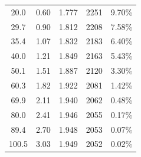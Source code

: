 \documentclass{thuemp}
\begin{document}
\begin{table}[H]
\begin{tabular}{ccccc}
        20.0   & 0.60  & 1.777 & 2251 & 9.70\%  \\
        29.7   & 0.90  & 1.812 & 2208 & 7.58\%  \\
        35.4   & 1.07  & 1.832 & 2183 & 6.40\%  \\
        40.0   & 1.21  & 1.849 & 2163 & 5.43\%  \\
        50.1   & 1.51  & 1.887 & 2120 & 3.30\%  \\
        60.3   & 1.82  & 1.922 & 2081 & 1.42\%  \\
        69.9   & 2.11  & 1.940 & 2062 & 0.48\%  \\
        80.0   & 2.41  & 1.946 & 2055 & 0.17\%  \\
        89.4   & 2.70  & 1.948 & 2053 & 0.07\%  \\
        100.5  & 3.03  & 1.949 & 2052 & 0.02\%  \\
        \bottomrule
    \end{tabular}
\end{table}
\end{document}
